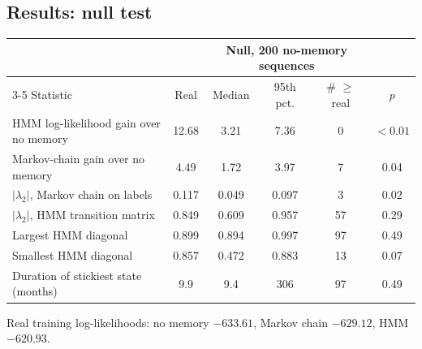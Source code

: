 \documentclass[11pt]{article}
\begin{document}
\subsection{Results: null test}
\begin{center}
\small
\begin{tabular}{l c ccc c}
\toprule
 & & \multicolumn{3}{c}{Null, 200 no-memory sequences} & \\
\cmidrule(lr){3-5}
Statistic & Real & Median & 95th pct. & \# $\ge$ real & $p$ \\
\midrule
HMM log-likelihood gain over no memory & 12.68 & 3.21 & 7.36 & 0 & $<0.01$ \\
Markov-chain gain over no memory & 4.49 & 1.72 & 3.97 & 7 & 0.04 \\
$|\lambda_2|$, Markov chain on labels & 0.117 & 0.049 & 0.097 & 3 & 0.02 \\
$|\lambda_2|$, HMM transition matrix & 0.849 & 0.609 & 0.957 & 57 & 0.29 \\
Largest HMM diagonal & 0.899 & 0.894 & 0.997 & 97 & 0.49 \\
Smallest HMM diagonal & 0.857 & 0.472 & 0.883 & 13 & 0.07 \\
Duration of stickiest state (months) & 9.9 & 9.4 & 306 & 97 & 0.49 \\
\bottomrule
\end{tabular}
\end{center}
\noindent Real training log-likelihoods: no memory $-633.61$, Markov chain $-629.12$, HMM $-620.93$.
\end{document}
